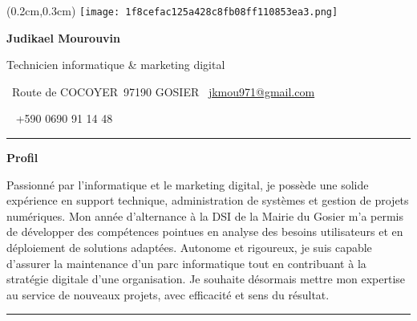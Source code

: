 \documentclass[a4paper]{article}
\newcommand{\fullrule}{\hspace{-1.5cm}\rule{\paperwidth}{0.4pt}}
\newcommand{\cvsection}[1]{%
  \vspace{6pt}\textbf{\Large #1}\par\vspace{2pt}}
\begin{document}
\color{white}
\begin{textblock*}{4cm}(0.2cm,0.3cm)
  \texttt{[image: 1f8cefac125a428c8fb08ff110853ea3.png]}
\end{textblock*}

\begin{center}
  {\fontsize{44pt}{24pt}\selectfont\bfseries Judikael Mourouvin}

  \bigskip
  {\Large Technicien informatique \& marketing digital}

  \bigskip\bigskip
  \faMapMarker~Route de COCOYER\ 97190 GOSIER
  \quad\faEnvelope~\href{mailto:jkmou971@gmail.com}{jkmou971@gmail.com}

  \bigskip
  \faPhone~ +590 0690 91 14 48
  \quad \faLinkedin\ \href{}{}
 

  \vspace{-0.3cm}
  \fullrule
\end{center}

\cvsection{Profil}
\hspace*{2cm}%
Passionné par l’informatique et le marketing digital, je possède une solide expérience en support technique, administration de systèmes et gestion de projets numériques. Mon année d’alternance à la DSI de la Mairie du Gosier m’a permis de développer des compétences pointues en analyse des besoins utilisateurs et en déploiement de solutions adaptées. Autonome et rigoureux, je suis capable d’assurer la maintenance d’un parc informatique tout en contribuant à la stratégie digitale d’une organisation. Je souhaite désormais mettre mon expertise au service de nouveaux projets, avec efficacité et sens du résultat.

\medskip\fullrule
\end{document}
